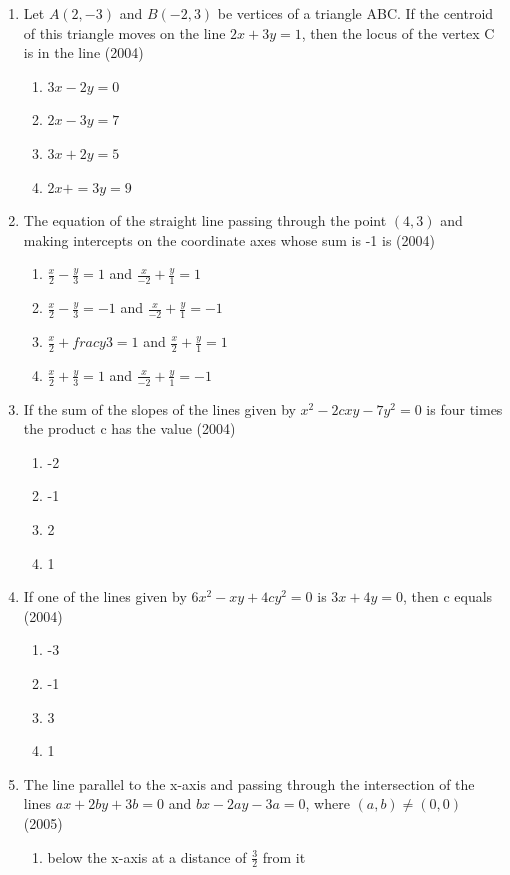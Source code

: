 \documentclass[12pt]{article}
\begin{document}
\begin{enumerate}
\begin{enumerate}
\end{enumerate}
\item Let $A(2,-3)$ and $B(-2,3)$ be vertices of a triangle ABC. If the centroid of this triangle moves on the line $2x+3y=1$, then the locus of the vertex C is in the line  (2004)
\begin{enumerate}
\item $3x-2y=0$
\item $2x-3y=7$ 
\item $3x+2y=5$ 
\item $2x+=3y=9$
\end{enumerate}
\item The equation of the straight line passing through the point $(4,3)$ and making intercepts on the coordinate axes whose sum is -1 is (2004)
\begin{enumerate}
\item $\frac{x}{2}-\frac{y}{3}=1$ and $\frac{x}{-2}+\frac{y}{1}=1$
\item $\frac{x}{2}-\frac{y}{3}=-1$ and $\frac{x}{-2}+\frac{y}{1}=-1$
\item $\frac{x}{2}+frac{y}{3}=1$ and $\frac{x}{2}+\frac{y}{1}=1$
\item $\frac{x}{2}+\frac{y}{3}=1$ and $\frac{x}{-2}+\frac{y}{1}=-1$
\end{enumerate}
\item If the sum of the slopes of the lines given by $x^2-2cxy-7y^2=0$ is four times the product c has the value (2004)
\begin{enumerate}
\item -2 
\item -1 
\item  2 
\item  1
\end{enumerate}
\item If one of the lines given by $6x^2-xy+4cy^2=0$ is $3x+4y=0$, then c equals (2004)
\begin{enumerate}
\item -3 
\item -1 
\item  3 
\item  1
\end{enumerate}
\item The line parallel to the x-axis and passing through the intersection of the lines $ax+2by+3b=0$ and $bx-2ay-3a=0$, where $(a,b) \neq (0,0)$ (2005)
\begin{enumerate}
\item below the x-axis at a distance of $\frac{3}{2}$ from it

\end{enumerate}
\end{enumerate}
\end{document}
